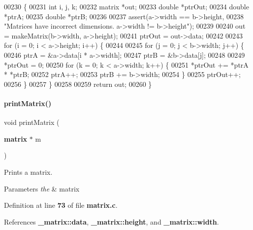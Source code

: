 \begin{DoxyCode}
00230                                              \{
00231   \textcolor{keywordtype}{int} i, j, k;
00232   matrix *out;
00233   \textcolor{keywordtype}{double} *ptrOut;
00234   \textcolor{keywordtype}{double} *ptrA;
00235   \textcolor{keywordtype}{double} *ptrB;
00236 
00237   assert(a->width == b->height,
00238          \textcolor{stringliteral}{"Matrices have incorrect dimensions. a->width != b->height"});
00239 
00240   out = makeMatrix(b->width, a->height);
00241   ptrOut = out->data;
00242 
00243   \textcolor{keywordflow}{for} (i = 0; i < a->height; i++) \{
00244 
00245     \textcolor{keywordflow}{for} (j = 0; j < b->width; j++) \{
00246       ptrA = &a->data[i * a->width];
00247       ptrB = &b->data[j];
00248 
00249       *ptrOut = 0;
00250       \textcolor{keywordflow}{for} (k = 0; k < a->width; k++) \{
00251         *ptrOut += *ptrA * *ptrB;
00252         ptrA++;
00253         ptrB += b->width;
00254       \}
00255       ptrOut++;
00256     \}
00257   \}
00258 
00259   \textcolor{keywordflow}{return} out;
00260 \}
\end{DoxyCode}
\mbox{\label{a00041_a50ab2b1ac33d6993d93522fc4f30a051}} 
\paragraph{print\+Matrix()}
{\footnotesize\ttfamily void print\+Matrix (\begin{DoxyParamCaption}\item[{\textbf{ matrix} $\ast$}]{m }\end{DoxyParamCaption})}



Prints a matrix. 


\begin{DoxyParams}{Parameters}
{\em the} & matrix \\
\hline
\end{DoxyParams}


Definition at line \textbf{ 73} of file \textbf{ matrix.\+c}.



References \textbf{ \+\_\+matrix\+::data}, \textbf{ \+\_\+matrix\+::height}, and \textbf{ \+\_\+matrix\+::width}.


\mbox{\label{a00041_acdd57777a972ce339153878fa917db14}} 
